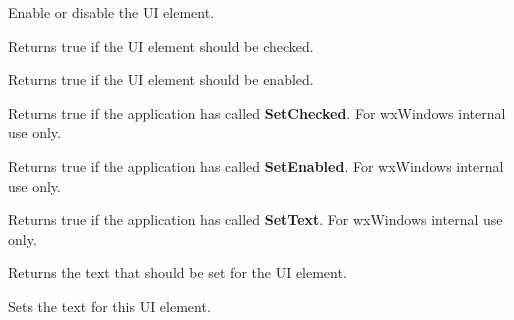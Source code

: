 
Enable or disable the UI element.

\label{wxupdateuieventgetchecked}


Returns true if the UI element should be checked.

\label{wxupdateuieventgetenabled}


Returns true if the UI element should be enabled.

\label{wxupdateuieventgetsetchecked}


Returns true if the application has called {\bf SetChecked}. For wxWindows internal use only.

\label{wxupdateuieventgetsetenabled}


Returns true if the application has called {\bf SetEnabled}. For wxWindows internal use only.

\label{wxupdateuieventgetsettext}


Returns true if the application has called {\bf SetText}. For wxWindows internal use only.

\label{wxupdateuieventgettext}


Returns the text that should be set for the UI element.

\label{wxupdateuieventsettext}


Sets the text for this UI element.

